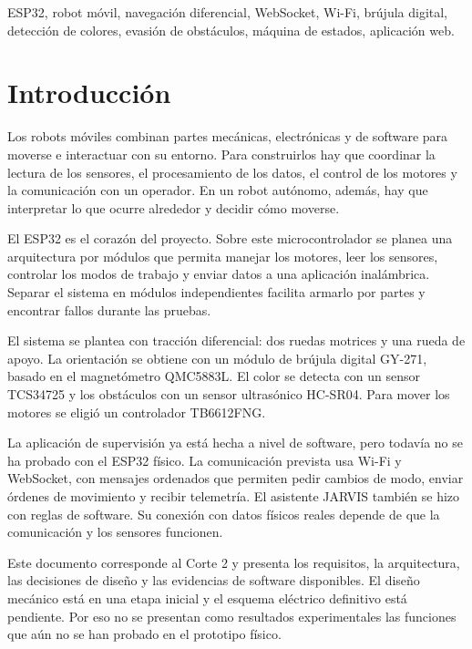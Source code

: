 \documentclass[journal]{IEEEtran}
\begin{document}

\begin{IEEEkeywords}
ESP32, robot móvil, navegación diferencial, WebSocket, Wi-Fi, brújula digital, detección de colores, evasión de obstáculos, máquina de estados, aplicación web.
\end{IEEEkeywords}


\section{Introducción}

Los robots móviles combinan partes mecánicas, electrónicas y de software para moverse e interactuar con su entorno. Para construirlos hay que coordinar la lectura de los sensores, el procesamiento de los datos, el control de los motores y la comunicación con un operador. En un robot autónomo, además, hay que interpretar lo que ocurre alrededor y decidir cómo moverse.

El ESP32 es el corazón del proyecto. Sobre este microcontrolador se planea una arquitectura por módulos que permita manejar los motores, leer los sensores, controlar los modos de trabajo y enviar datos a una aplicación inalámbrica. Separar el sistema en módulos independientes facilita armarlo por partes y encontrar fallos durante las pruebas.

El sistema se plantea con tracción diferencial: dos ruedas motrices y una rueda de apoyo. La orientación se obtiene con un módulo de brújula digital GY-271, basado en el magnetómetro QMC5883L. El color se detecta con un sensor TCS34725 y los obstáculos con un sensor ultrasónico HC-SR04. Para mover los motores se eligió un controlador TB6612FNG.

La aplicación de supervisión ya está hecha a nivel de software, pero todavía no se ha probado con el ESP32 físico. La comunicación prevista usa Wi-Fi y WebSocket, con mensajes ordenados que permiten pedir cambios de modo, enviar órdenes de movimiento y recibir telemetría. El asistente JARVIS también se hizo con reglas de software. Su conexión con datos físicos reales depende de que la comunicación y los sensores funcionen.

Este documento corresponde al Corte 2 y presenta los requisitos, la arquitectura, las decisiones de diseño y las evidencias de software disponibles. El diseño mecánico está en una etapa inicial y el esquema eléctrico definitivo está pendiente. Por eso no se presentan como resultados experimentales las funciones que aún no se han probado en el prototipo físico.
\end{document}
